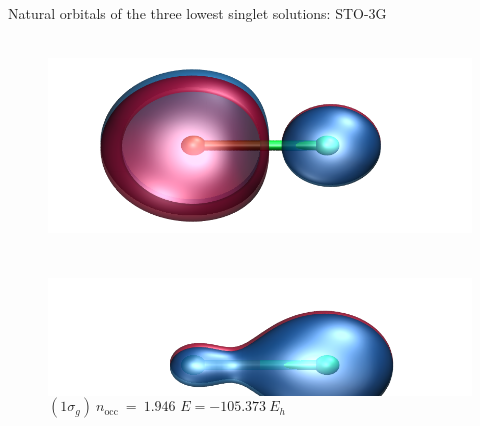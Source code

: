 \documentclass[10pt]{beamer}
\begin{document}
\begin{frame}{Natural orbitals of the three lowest singlet solutions:  STO-3G}
  \begin{figure}
    \begin{columns}[b]
      
      \begin{column}{0.31\textwidth}
        \includegraphics[height=0.6\textwidth]{Figures/lifr3_gs_mo7.cube.png}
        \caption*{\centering $(2\sigma_g)~n_\text{occ}~=~0.054$}
        \includegraphics[height=0.6\textwidth]{Figures/lifr3_gs_mo6.cube.png}
        \caption*{\centering $(1\sigma_g)~n_\text{occ}~=~1.946$
        $E=-105.373~E_h$}
      \end{column}


\end{columns}
\end{figure}
\end{frame}
\end{document}

